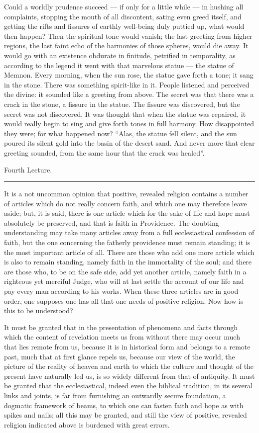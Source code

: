\documentclass[12pt,a4paper,openany]{book}
\newcommand{\opage}[1]{\marginnote{\footnotesize\textit{[#1]}}}
\newcommand{\lecture}[1]{\clearpage\phantomsection\addcontentsline{toc}{chapter}{#1}\begin{center}{\large #1}\\[0.4em]\rule{3em}{0.4pt}\end{center}\medskip\noindent}
\begin{document}
Could a worldly prudence succeed --- if only for a little while --- in hushing all complaints,
stopping the mouth of all discontent, sating even greed itself, and getting the rifts and
fissures of earthly well-being duly puttied up, what would then happen? Then the spiritual tone
would vanish; the last greeting from higher regions, the last faint echo of the harmonies of
those spheres, would die away. It would go with an existence obdurate in finitude, petrified in
temporality, as according to the legend it went with that marvelous statue --- the statue of
Memnon. Every morning, when the sun rose, the statue gave forth a tone; it sang in the stone.
There was something spirit-like in it. People listened and perceived the divine: it sounded
like a greeting from above. The secret was that there was a crack in the stone, a fissure in the
statue. The fissure was discovered, but the secret was not discovered. It was thought that when
the statue was repaired, it would really begin to sing and give forth tones in full harmony. How
disappointed they were; for what happened now? ``Alas, the statue fell silent, and the sun
poured its silent gold into the basin of the desert sand. And never more that clear greeting
sounded, from the same hour that the crack was healed''.

\setcounter{footnote}{0}%
\lecture{Fourth Lecture.}\opage{52}It is a not uncommon opinion that positive, revealed religion contains a number of articles
which do not really concern faith, and which one may therefore leave aside; but, it is said, there is one article
which for the sake of life and hope must absolutely be preserved, and that is faith in Providence. The doubting
understanding may take many articles away from a full ecclesiastical confession of faith, but the one concerning
the fatherly providence must remain standing; it is the most important article of all. There are those who add one
more article which is also to remain standing, namely faith in the immortality of the soul; and there are those
who, to be on the safe side, add yet another article, namely faith in a righteous yet merciful Judge, who will at
last settle the account of our life and pay every man according to his works. When these three articles are in good
order, one supposes one has all that one needs of positive religion. Now how is this to be understood?

It must be granted that in the presentation of phenomena and facts through which the content of revelation meets us
from without there may
\setcounter{footnote}{0}%
\opage{53}occur much that lies remote from us, because it is in historical form and belongs to a remote past, much
that at first glance repels us, because our view of the world, the picture of the reality of heaven and earth to
which the culture and thought of the present have naturally led us, is so widely different from that of antiquity.
It must be granted that the ecclesiastical, indeed even the biblical tradition, in its several links and joints, is
far from furnishing an outwardly secure foundation, a dogmatic framework of beams, to which one can fasten faith and
hope as with spikes and nails; all this may be granted, and still the view of positive, revealed religion indicated
above is burdened with great errors.
\end{document}
